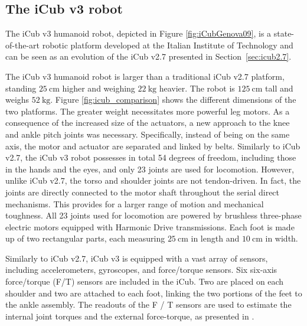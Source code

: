 \subsection{The iCub v3 robot} \label{sec:iCub3}
The iCub v3 humanoid robot, depicted in Figure \ref{fig:iCubGenova09}, is a state-of-the-art robotic platform developed at the Italian Institute of Technology and can be seen as an evolution of the iCub v2.7 presented in Section~\ref{sec:icub2.7}. 
\par
The iCub v3 humanoid robot is larger than a traditional iCub v2.7 platform, standing $\SI{25}{\centi\meter}$ higher and weighing $\SI{22}{\kilo\gram}$ heavier. The robot is $\SI{125}{\centi\meter}$ tall and weighs $\SI{52}{\kilo\gram}$. Figure \ref{fig:icub_comparison} shows the different dimensions of the two platforms.
The greater weight necessitates more powerful leg motors. As a consequence of the increased size of the actuators, a new approach to the knee and ankle pitch joints was necessary. Specifically, instead of being on the same axis, the motor and actuator are separated and linked by belts. Similarly to iCub v2.7, the iCub v3 robot possesses in total 54 degrees of freedom, including those in the hands and the eyes, and only 23 joints are used for locomotion. However, unlike iCub v2.7, the torso and shoulder joints are not tendon-driven. In fact, the joints are directly connected to the motor shaft throughout the serial direct mechanisms. This provides for a larger range of motion and mechanical toughness.
All 23 joints used for locomotion are powered by brushless three-phase electric motors equipped with Harmonic Drive transmissions. 
Each foot is made up of two rectangular parts, each measuring $\SI{25}{\centi\meter}$ in length and $\SI{10}{\centi\meter}$ in width.
\par
Similarly to iCub v2.7, iCub v3 is equipped with a vast array of sensors, including accelerometers, gyroscopes, and force/torque sensors. Six six-axis force/torque (F/T) sensors are included in the iCub. Two are placed on each shoulder and two are attached to each foot, linking the two portions of the feet to the ankle assembly. The readouts of the F / T sensors are used to estimate the internal joint torques and the external force-torque, as presented in \citep[Chapter~4]{Traversaro2017ModellingDynamics}.

